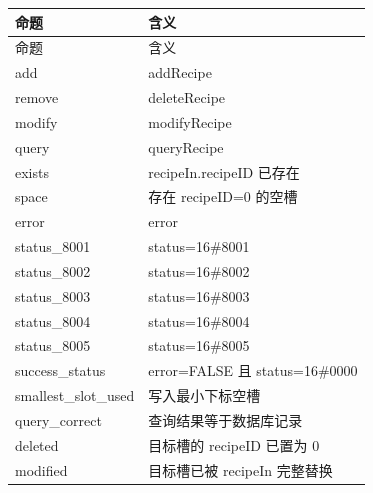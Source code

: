 \begin{longtable}{L{3.3cm}L{10.0cm}}

\toprule

命题 & 含义\\

\midrule

\endfirsthead

\toprule

命题 & 含义\\

\midrule

\endhead

{\ttfamily add} & addRecipe\\

{\ttfamily remove} & deleteRecipe\\

{\ttfamily modify} & modifyRecipe\\

{\ttfamily query} & queryRecipe\\

{\ttfamily exists} & recipeIn.recipeID 已存在\\

{\ttfamily space} & 存在 recipeID=0 的空槽\\

{\ttfamily error} & error\\

{\ttfamily status\_8001} & status=16\#8001\\

{\ttfamily status\_8002} & status=16\#8002\\

{\ttfamily status\_8003} & status=16\#8003\\

{\ttfamily status\_8004} & status=16\#8004\\

{\ttfamily status\_8005} & status=16\#8005\\

{\ttfamily success\_status} & error=FALSE 且 status=16\#0000\\

{\ttfamily smallest\_slot\_used} & 写入最小下标空槽\\

{\ttfamily query\_correct} & 查询结果等于数据库记录\\

{\ttfamily deleted} & 目标槽的 recipeID 已置为 0\\

{\ttfamily modified} & 目标槽已被 recipeIn 完整替换\\

\bottomrule

\end{longtable}

